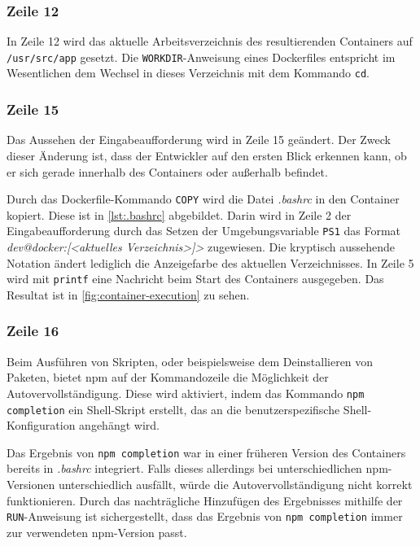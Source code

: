 \subsubsection{Zeile 12}
In Zeile 12 wird das aktuelle Arbeitsverzeichnis des resultierenden Containers auf \verb|/usr/src/app| gesetzt.
Die \verb|WORKDIR|-Anweisung eines Dockerfiles entspricht im Wesentlichen dem Wechsel in dieses Verzeichnis mit dem Kommando \verb|cd|.

\subsubsection {Zeile 15}
Das Aussehen der Eingabeaufforderung wird in Zeile 15 geändert.
Der Zweck dieser Änderung ist, dass der Entwickler auf den ersten Blick erkennen kann, ob er sich gerade innerhalb des Containers oder außerhalb befindet.

Durch das Dockerfile-Kommando \verb|COPY| wird die Datei \emph{.bashrc} in den Container kopiert.
Diese ist in \cref{lst:.bashrc} abgebildet.
Darin wird in Zeile 2 der Eingabeaufforderung durch das Setzen der Umgebungsvariable \verb|PS1| das Format \emph{dev@docker:[<aktuelles Verzeichnis>]>} zugewiesen.
Die kryptisch aussehende Notation ändert lediglich die Anzeigefarbe des aktuellen Verzeichnisses.
In Zeile 5 wird mit \verb|printf| eine Nachricht beim Start des Containers ausgegeben.
Das Resultat ist in \cref{fig:container-execution} zu sehen.


\subsubsection {Zeile 16}
Beim Ausführen von Skripten, oder beispielsweise dem Deinstallieren von Paketen, bietet npm auf der Kommandozeile die Möglichkeit der Autovervollständigung.
Diese wird aktiviert, indem das Kommando \verb|npm completion| ein Shell-Skript erstellt, das an die benutzerspezifische Shell-Konfiguration angehängt wird.

Das Ergebnis von \verb|npm completion| war in einer früheren Version des Containers bereits in \emph{.bashrc} integriert.
Falls dieses allerdings bei unterschiedlichen npm-Versionen unterschiedlich ausfällt, würde die Autovervollständigung nicht korrekt funktionieren.
Durch das nachträgliche Hinzufügen des Ergebnisses mithilfe der \verb|RUN|-Anweisung ist sichergestellt, dass das Ergebnis von \verb|npm completion| immer zur verwendeten npm-Version passt.

